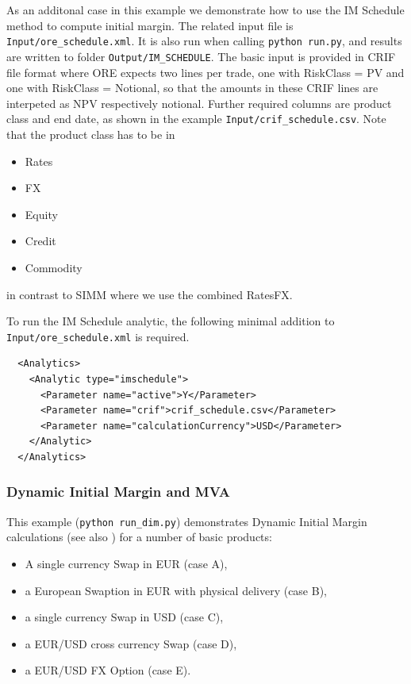 As an additonal case in this example we demonstrate how to use the IM Schedule method to compute initial margin.
The related input file is {\tt Input/ore\_schedule.xml}. It is also run when calling {\tt python run.py}, and results are written to folder 
{\tt Output/IM\_SCHEDULE}.
The basic input is provided in CRIF file format where ORE expects two lines per trade, one with RiskClass = PV and one with RiskClass = Notional, 
so that the  amounts in these CRIF lines are interpeted as NPV respectively notional. 
Further required columns are product class and end date, as shown in the example {\tt Input/crif\_schedule.csv}. Note that the product class has to be in
\begin{itemize}
  \item Rates
  \item FX
  \item Equity
  \item Credit
  \item Commodity
\end{itemize}
in contrast to SIMM where we use the combined RatesFX.

To run the IM Schedule analytic, the following minimal addition to {\tt Input/ore\_schedule.xml} is required.
\begin{verbatim}
  <Analytics>
    <Analytic type="imschedule">
      <Parameter name="active">Y</Parameter>
      <Parameter name="crif">crif_schedule.csv</Parameter>
      <Parameter name="calculationCurrency">USD</Parameter>
    </Analytic>
  </Analytics>
\end{verbatim}

\subsubsection{Dynamic Initial Margin and MVA}\label{example:initialmargin_dim}

This example ({\tt python run\_dim.py}) demonstrates Dynamic Initial Margin calculations (see also \cite{methods}) for a number of basic products:
\begin{itemize}
\item A single currency Swap in EUR (case A), 
\item a European Swaption in EUR with physical delivery (case B), 
\item a single currency Swap in USD (case C),
\item a EUR/USD cross currency Swap (case D),
\item a EUR/USD FX Option (case E).
\end{itemize}

